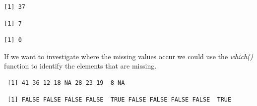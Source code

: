 \documentclass[
  letterpaper,
  DIV=11,
  numbers=noendperiod]{scrreprt}
\newenvironment{Shaded}{\begin{snugshade}}{\end{snugshade}}
\newcommand{\DecValTok}[1]{\textcolor[rgb]{0.68,0.00,0.00}{#1}}
\newcommand{\FunctionTok}[1]{\textcolor[rgb]{0.28,0.35,0.67}{#1}}
\newcommand{\NormalTok}[1]{\textcolor[rgb]{0.00,0.23,0.31}{#1}}
\newcommand{\SpecialCharTok}[1]{\textcolor[rgb]{0.37,0.37,0.37}{#1}}
\begin{document}
\begin{verbatim}
[1] 37
\end{verbatim}

\begin{Shaded}
\end{Shaded}

\begin{verbatim}
[1] 7
\end{verbatim}

\begin{Shaded}
\end{Shaded}

\begin{verbatim}
[1] 0
\end{verbatim}

If we want to investigate where the missing values occur we could use
the \emph{which()} function to identify the elements that are missing.

\begin{Shaded}
\end{Shaded}

\begin{verbatim}
 [1] 41 36 12 18 NA 28 23 19  8 NA
\end{verbatim}

\begin{Shaded}
\end{Shaded}

\begin{verbatim}
 [1] FALSE FALSE FALSE FALSE  TRUE FALSE FALSE FALSE FALSE  TRUE
\end{verbatim}
\end{document}
